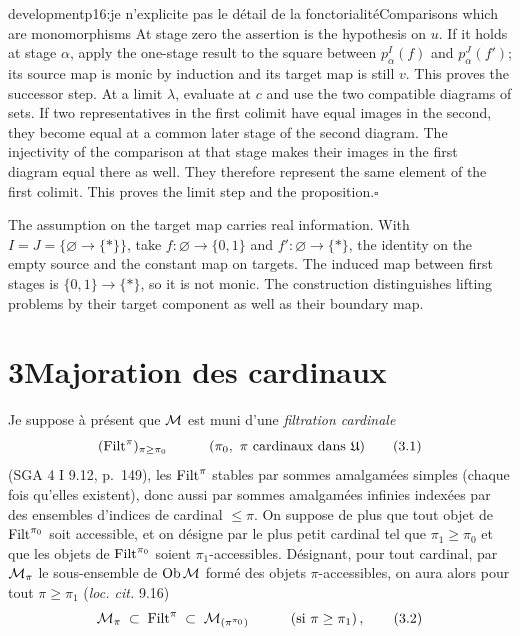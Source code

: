 \begin{dcomment}{development}{p16:je n'explicite pas le détail de la fonctorialité}{Comparisons which are monomorphisms}
At stage zero the assertion is the hypothesis on $u$. If it holds at stage $\alpha$, apply the one-stage result to the square between $p_\alpha^I(f)$ and $p_\alpha^J(f')$; its source map is monic by induction and its target map is still $v$. This proves the successor step. At a limit $\lambda$, evaluate at $c$ and use the two compatible diagrams of sets. If two representatives in the first colimit have equal images in the second, they become equal at a common later stage of the second diagram. The injectivity of the comparison at that stage makes their images in the first diagram equal there as well. They therefore represent the same element of the first colimit. This proves the limit step and the proposition.\hfill$\square$

The assumption on the target map carries real information. With $I=J=\{\varnothing\to\{*\}\}$, take $f:\varnothing\to\{0,1\}$ and $f':\varnothing\to\{*\}$, the identity on the empty source and the constant map on targets. The induced map between first stages is $\{0,1\}\to\{*\}$, so it is not monic. The construction distinguishes lifting problems by their target component as well as their boundary map.
\end{dcomment}


\section*{3\quad Majoration des cardinaux}

Je suppose à présent que $\mathcal{M}$ est muni d'une \textit{filtration cardinale}
\[
(\Filt^\pi)_{\pi\geq\pi_0} \qquad\quad (\pi_0,\ \pi \text{ cardinaux dans } \mathfrak{U})
\tag*{(3.1)}
\]
(SGA 4 I 9.12, p.~149), les $\mathrm{Filt}^\pi$ stables par sommes amalgamées simples (chaque fois qu'elles existent), donc aussi par sommes amalgamées infinies indexées par des ensembles
d'indices de cardinal $\leq\pi$. On suppose de plus que tout objet de $\mathrm{Filt}^{\pi_0}$ soit accessible, et on désigne par  le plus petit cardinal tel que $\pi_1\geq\pi_0$ et que les objets de $\mathrm{Filt}^{\pi_0}$ soient $\pi_1$-accessibles. Désignant, pour tout cardinal, par $\mathcal{M}_\pi$ le sous-ensemble de $\mathrm{Ob}\,\mathcal{M}$ formé des objets $\pi$-accessibles, on aura alors pour tout $\pi\geq\pi_1$ (\textit{loc. cit.} 9.16)
\[
\mathcal{M}_\pi \;\subset\; \mathrm{Filt}^\pi \;\subset\; \mathcal{M}_{(\pi^{\pi_0})} \qquad\quad (\text{si } \pi\geq\pi_1)\,,
\tag*{(3.2)}
\]


